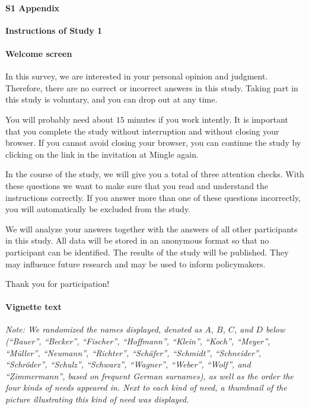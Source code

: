 \documentclass[10pt,letterpaper]{article}
\begin{document}
\paragraph*{S1 Appendix}
{\bf Instructions of Study 1}


\paragraph*{Welcome screen}
In this survey, we are interested in your personal opinion and judgment.
Therefore, there are no correct or incorrect answers in this study.
Taking part in this study is voluntary, and you can drop out at any time.

You will probably need about $15$ minutes if you work intently.
It is important that you complete the study without interruption and without closing your browser.
If you cannot avoid closing your browser, you can continue the study by clicking on the link in the invitation at Mingle again.

In the course of the study, we will give you a total of three attention checks.
With these questions we want to make sure that you read and understand the instructions correctly.
If you answer more than one of these questions incorrectly, you will automatically be excluded from the study.

We will analyze your answers together with the answers of all other participants in this study.
All data will be stored in an anonymous format so that no participant can be identified.
The results of the study will be published.
They may influence future research and may be used to inform policymakers.

Thank you for participation!


\paragraph*{Vignette text}

\noindent\textit{Note: We randomized the names displayed, denoted as $A$, $B$, $C$, and $D$ below (``Bauer'', ``Becker'', ``Fischer'', ``Hoffmann'', ``Klein'', ``Koch'', ``Meyer'', ``Müller'', ``Neumann'', ``Richter'', ``Schäfer'', ``Schmidt'', ``Schneider'', ``Schröder'', ``Schulz'', ``Schwarz'', ``Wagner'', ``Weber'', ``Wolf'', and ``Zimmermann'', based on frequent German surnames), as well as the order the four kinds of needs appeared in.
Next to each kind of need, a thumbnail of the picture illustrating this kind of need was displayed.}\vspace{2ex}
\end{document}
